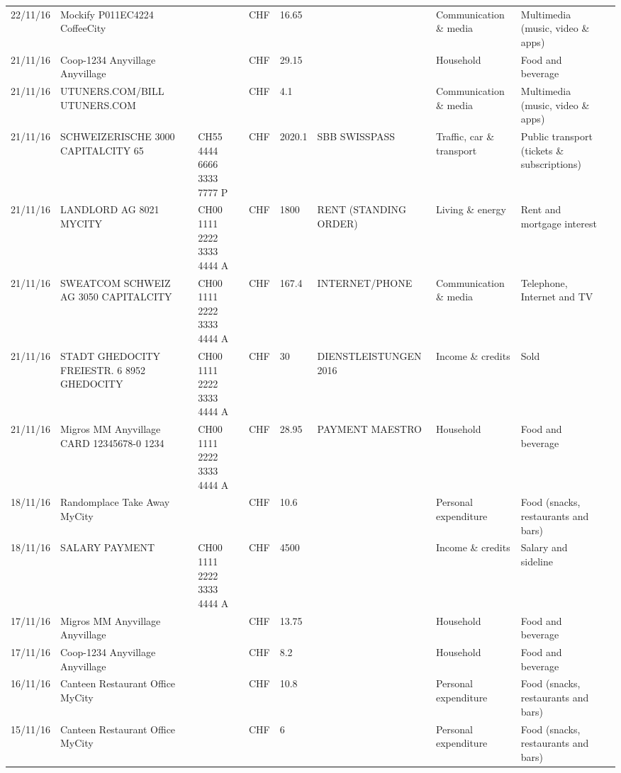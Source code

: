 \begin{landscape}
\begin{tiny}
\begin{longtable}{lp{4cm}llllp{3cm}ll}
		    22/11/16 & Mockify P011EC4224       CoffeeCity &       & CHF   & 16.65 &       & Communication \& media & Multimedia (music, video \& apps) \\
		    21/11/16 & Coop-1234 Anyvillage    Anyvillage &       & CHF   & 29.15 &       & Household & Food and beverage \\
		    21/11/16 & UTUNERS.COM/BILL          UTUNERS.COM &       & CHF   & 4.1   &       & Communication \& media & Multimedia (music, video \& apps) \\
		    21/11/16 & SCHWEIZERISCHE 3000 CAPITALCITY 65 & CH55 4444 6666 3333 7777 P & CHF   & 2020.1 & SBB SWISSPASS & Traffic, car \& transport & Public transport (tickets \& subscriptions) \\
		    21/11/16 & LANDLORD AG 8021 MYCITY & CH00 1111 2222 3333 4444 A & CHF   & 1800  & RENT (STANDING ORDER) & Living \& energy & Rent and mortgage interest \\
		    21/11/16 & SWEATCOM SCHWEIZ AG 3050 CAPITALCITY & CH00 1111 2222 3333 4444 A & CHF   & 167.4 & INTERNET/PHONE & Communication \& media & Telephone,  Internet and TV \\
		    21/11/16 & STADT GHEDOCITY FREIESTR. 6 8952 GHEDOCITY & CH00 1111 2222 3333 4444 A & CHF   & 30    & DIENSTLEISTUNGEN 2016 & Income \& credits & Sold \\
		    21/11/16 & Migros MM Anyvillage CARD 12345678-0 1234 & CH00 1111 2222 3333 4444 A & CHF   & 28.95 & PAYMENT MAESTRO & Household & Food and beverage \\
		    18/11/16 & Randomplace Take Away     MyCity &       & CHF   & 10.6  &       & Personal expenditure & Food (snacks, restaurants and bars) \\
		    18/11/16 & SALARY PAYMENT & CH00 1111 2222 3333 4444 A & CHF   & 4500  &       & Income \& credits & Salary and sideline \\
		    17/11/16 & Migros MM Anyvillage    Anyvillage &       & CHF   & 13.75 &       & Household & Food and beverage \\
		    17/11/16 & Coop-1234 Anyvillage    Anyvillage &       & CHF   & 8.2   &       & Household & Food and beverage \\
		    16/11/16 & Canteen Restaurant Office      MyCity &       & CHF   & 10.8  &       & Personal expenditure & Food (snacks, restaurants and bars) \\
		    15/11/16 & Canteen Restaurant Office      MyCity &       & CHF   & 6     &       & Personal expenditure & Food (snacks, restaurants and bars) \\

\end{longtable}
\end{tiny}
\end{landscape}
